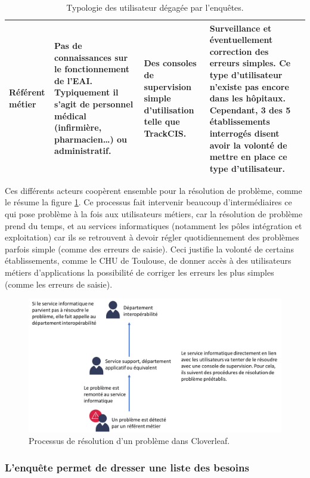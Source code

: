\begin{table}[H]
\begin{tabular}{| p{3cm} | p{} | p{} | p{} |}
					\hline
						Référent métier
						&
						Pas de connaissances sur le fonctionnement de l’EAI. Typiquement il s'agit
						de personnel médical (infirmière, pharmacien\ldots) ou administratif.
						&
						Des consoles de supervision simple d'utilisation telle que TrackCIS.
						&
						Surveillance et éventuellement correction des erreurs simples. Ce type
						d'utilisateur n'existe pas encore dans les hôpitaux. Cependant, 3 des 5
						établissements interrogés disent avoir la volonté de mettre en place ce
						type d'utilisateur.
						\\
					\hline
				\end{tabular}
				\caption{\label{type_utilisateurs} Typologie des utilisateur dégagée par
				l'enquêtes.}
			\end{table}
			Ces différents acteurs coopèrent ensemble pour la résolution de problème,
			comme le résume la figure \ref{resolution_pbs}. Ce processus fait intervenir
			beaucoup d’intermédiaires ce qui pose problème à la fois aux utilisateurs métiers,
			car la résolution de problème prend du temps, et au services informatiques
			(notamment les pôles intégration et exploitation) car ils se retrouvent à
			devoir régler quotidiennement des problèmes parfois simple (comme des
			erreurs de saisie). Ceci justifie la volonté de certains établissements,
			comme le CHU de Toulouse, de donner accès à des utilisateurs métiers
			d’applications la possibilité de corriger les erreurs les plus simples
			(comme les erreurs de saisie).
			\begin{figure}[H]
				\centering
				\includegraphics[width=15cm]{../img/user_1.png}
				\caption{\label{resolution_pbs} Processus de résolution d'un problème dans
				Cloverleaf.}
			\end{figure}
			
		\subsubsection{L'enquête permet de dresser une liste des besoins}
